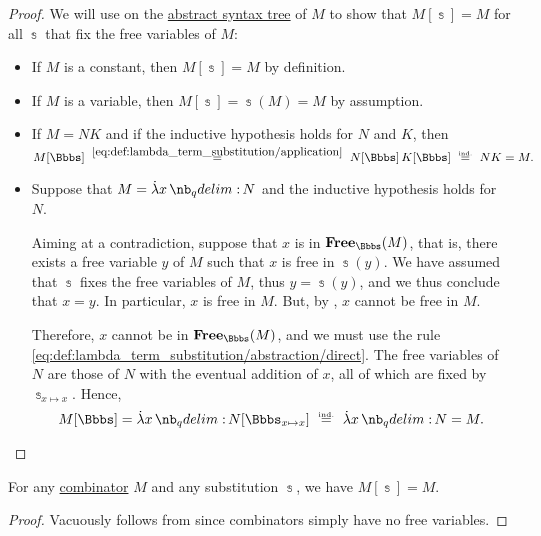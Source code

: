 \begin{proof}
  \NecessitySubProof We will use  on the \hyperref[def:lambda_term_ast]{abstract syntax tree} of \( M \) to show that \( M[\Bbbs] = M \) for all \( \Bbbs \) that fix the free variables of \( M \):
  \begin{itemize}
    \item If \( M \) is a constant, then \( M[\Bbbs] = M \) by definition.
    \item If \( M \) is a variable, then \( M[\Bbbs] = \Bbbs(M) = M \) by assumption.
    \item If \( M = NK \) and if the inductive hypothesis holds for \( N \) and \( K \), then
    \begin{equation*}
      M[\Bbbs]
      \reloset {\eqref{eq:def:lambda_term_substitution/application}} =
      N[\Bbbs] \thinspace K[\Bbbs]
      \reloset {\T{ind.}} =
      N K
      =
      M.
    \end{equation*}

    \item Suppose that \( M = \qabs x N \) and the inductive hypothesis holds for \( N \).

    Aiming at a contradiction, suppose that \( x \) is in \( \op*{Free}_\Bbbs(M) \), that is, there exists a free variable \( y \) of \( M \) such that \( x \) is free in \( \Bbbs(y) \). We have assumed that \( \Bbbs \) fixes the free variables of \( M \), thus \( y = \Bbbs(y) \), and we thus conclude that \( x = y \). In particular, \( x \) is free in \( M \). But, by , \( x \) cannot be free in \( M \).

    Therefore, \( x \) cannot be in \( \op*{Free}_\Bbbs(M) \), and we must use the rule \eqref{eq:def:lambda_term_substitution/abstraction/direct}. The free variables of \( N \) are those of \( N \) with the eventual addition of \( x \), all of which are fixed by \( \Bbbs_{x \mapsto x} \). Hence,
    \begin{equation*}
      M[\Bbbs]
      =
      \qabs x N[\Bbbs_{x \mapsto x}]
      \reloset {\T{ind.}} =
      \qabs x N
      =
      M.
    \end{equation*}
  \end{itemize}
\end{proof}

\begin{corollary}\label{thm:lambda_substitution_combinators}
  For any \hyperref[def:lambda_combinator]{combinator} \( M \) and any substitution \( \Bbbs \), we have \( M[\Bbbs] = M \).
\end{corollary}
\begin{proof}
  Vacuously follows from  since combinators simply have no free variables.
\end{proof}


